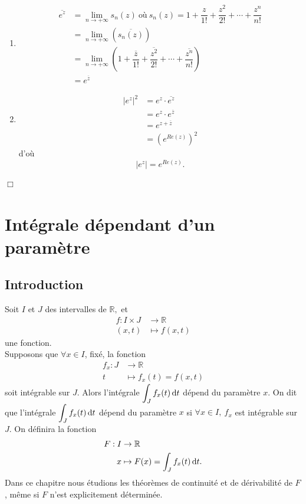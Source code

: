 \documentclass[11pt, a4paper]{book}
\newenvironment{pr}{\noindent {\bf Preuve} \noindent} {\hfill $\Box$\vskip 5mm}
\begin{document}
\begin{pr}\quad
\begin{enumerate}
\item \begin{align*}\overline{e^z}&=\lim_{n\rightarrow+\infty}s_n(z)~\text{o\`u}~s_n(z)=1+\dfrac{z}{1!}+\dfrac{z^2}{2!}+\cdots+\dfrac{z^n}{n!}\\ &=\lim_{n\rightarrow+\infty}\left(\overline{s_n(z)}\right)\\ &=\lim_{n\rightarrow+\infty}\left(1+\dfrac{\overline{z}}{1!}+\dfrac{\overline{z^2}}{2!}+\cdots+\dfrac{\overline{z^n}}{n!}\right)\\&=e^{\overline{z}} \end{align*}
\item \begin{align*}|e^z|^2&=e^z\cdot\overline{e^z}\\ &=e^z\cdot e^{\overline{z}}\\&=e^{z+\overline{z}}\\&=\left(e^{Re(z)}\right)^2 \end{align*}
d'o\`u $$|e^z|=e^{Re(z)}.$$
\end{enumerate}
\end{pr}


\chapter{Int\'egrale d\'ependant d'un param\`etre }
\section{Introduction}
Soit $I$ et $J$ des intervalles de $\mathbb{R},$ et \begin{align*}
f:I\times J&\rightarrow\mathbb{R}\\(x,t)&\mapsto f(x,t)
\end{align*}
une fonction.\\
Supposons que $\forall x\in I$, fix\'e, la fonction \begin{align*}
f_x:J&\rightarrow\mathbb{R}\\t&\mapsto f_x(t)=f(x,t)
\end{align*} soit int\'egrable sur $J$. Alors l'int\'egrale ${\displaystyle\int_Jf_x(t)\,\mathrm{d} t}$ d\'epend du param\`etre $x.$ On dit que l'int\'egrale ${\displaystyle\int_Jf_x(t)\,\mathrm{d} t}$ d\'epend du param\`etre $x$ si $\forall x\in I,~f_x$ est int\'egrable sur $J$. On d\'efinira la fonction \begin{align*}
F:I&\rightarrow \mathbb{R}\\x&\mapsto F(x)=\int_Jf_x(t)\,\mathrm{d} t.
\end{align*} Dans ce chapitre nous \'etudions les th\'eor\`emes de continuit\'e et de d\'erivabilit\'e de $F$, m\^eme si $F$ n'est explicitement d\'etermin\'ee.
\end{document}

